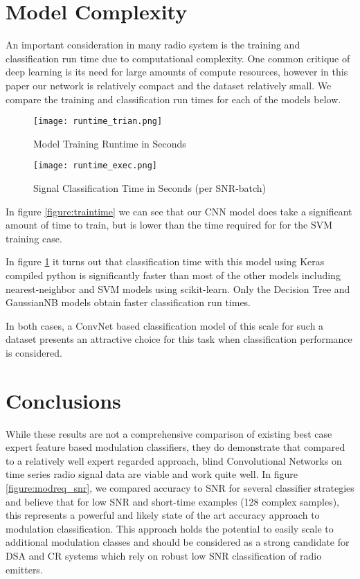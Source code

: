 \documentclass[runningheads,a4paper]{llncs}
\begin{document}
\section{Model Complexity}

An important consideration in many radio system is the training and classification run time due to computational complexity.  One common critique of deep learning is its need for large amounts of compute resources, however in this paper our network is relatively compact and the dataset relatively small.  We compare the training and classification run times for each of the models below.


\begin{figure}[ht]
\centering
\begin{minipage}[b]{0.45\linewidth}
      \texttt{[image: runtime\_trian.png]}
  \caption{Model Training Runtime in Seconds}\label{figure:traintime}
\end{minipage}
\quad
\begin{minipage}[b]{0.45\linewidth}
      \texttt{[image: runtime\_exec.png]}
  \caption{Signal Classification Time in Seconds (per SNR-batch)}\label{figure:exectime}
\end{minipage}
\end{figure}


In figure \ref{figure:traintime} we can see that our CNN model does take a significant amount of time to train, but is lower than the time required for for the SVM training case.

In figure \ref{figure:exectime} it turns out that classification time with this model using Keras compiled python is significantly faster than most of the other models including nearest-neighbor and SVM models using scikit-learn.  Only the Decision Tree and GaussianNB models obtain faster classification run times.

In both cases, a ConvNet based classification model of this scale for such a dataset presents an attractive choice for this task when classification performance is considered.

\section{Conclusions}

While these results are not a comprehensive comparison of existing best case expert feature based modulation classifiers, they do demonstrate that compared to a relatively well expert regarded approach, blind Convolutional Networks on time series radio signal data are viable and work quite well.  In figure \ref{figure:modreq_snr}, we compared accuracy to SNR for several classifier strategies and believe that for low SNR and short-time examples (128 complex samples), this represents a powerful and likely state of the art accuracy approach to modulation classification.  This approach holds the potential to easily scale to additional modulation classes and should be considered as a strong candidate for DSA and CR systems which rely on robust low SNR classification of radio emitters.
\end{document}
